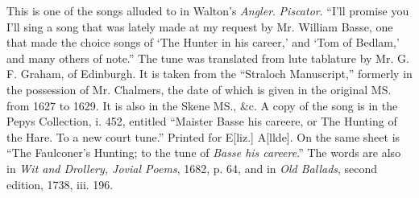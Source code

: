 
This is one of the songs alluded to in Walton’s \textit{Angler}. \textit{Piscator}. “I’ll
promise you I’ll sing a song that was lately made at my request by Mr. William
Basse, one that made the choice songs of ‘The Hunter in his career,’ and ‘Tom
of Bedlam,’ and many others of note.” The tune was translated from lute
tablature by Mr. G. F. Graham, of Edinburgh. It is taken from the “Straloch
Manuscript,” formerly in the possession of Mr. Chalmers, the date of which is
given in the original MS. from 1627 to 1629. It is also in the Skene MS., \&c.
A copy of the song is in the Pepys Collection, i. 452, entitled “Maister Basse
his careere, or The Hunting of the Hare. \pagebreak To a new court tune.” Printed for
E[liz.] A[llde]. On the same sheet is “The Faulconer’s Hunting; to the tune
of \textit{Basse his careere}.” The words are also in \textit{Wit and Drollery, Jovial Poems},
1682, p. 64, and in \textit{Old Ballads}, second edition, 1738, iii. 196.


\smallskip


